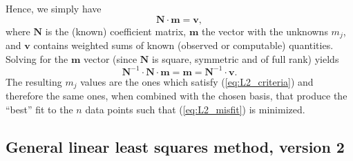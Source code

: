 Hence, we simply have
\begin{equation}
\mathbf{N \cdot m = v},
\label{eq:Nxvsolution}
\end{equation}
where $\mathbf{N}$ is the (known) coefficient matrix, $\mathbf{m}$ the vector with the unknowns $m_j$, and $\mathbf{v}$ contains 
weighted sums of known (observed or computable) quantities. Solving for the $\mathbf{m}$ vector (since $\mathbf{N}$ is square, symmetric and 
of full rank) yields
\begin{equation}
\mathbf{N}^{-1} \cdot \mathbf{N \cdot m} = \mathbf{m} = \mathbf{N}^{-1} \cdot \mathbf{v}.
\end{equation}	 
The resulting $m_j$ values are the ones which satisfy (\ref{eq:L2_criteria}) and 
therefore the same ones, when combined with the chosen basis, that produce the ``best'' fit to the 
$n$ data points such that (\ref{eq:L2_misfit}) is minimized.

\subsection{General linear least squares method, version 2}

